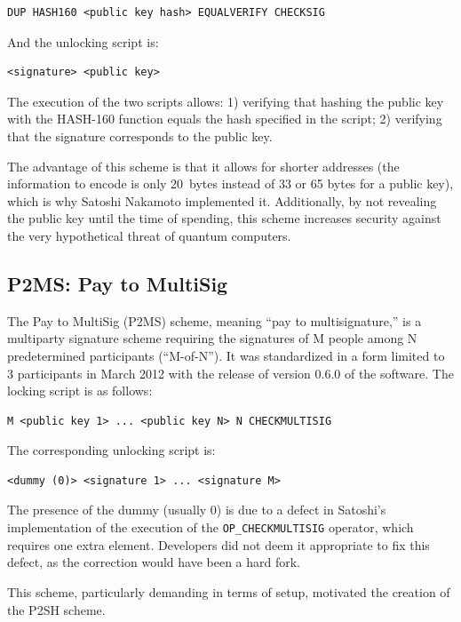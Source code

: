 \documentclass[
  a5paper,
  smalldemyvopaper,10pt,twoside,onecolumn,openright,extrafontsizes,hidelinks]{memoir}
\begin{document}
\begin{verbatim}
DUP HASH160 <public key hash> EQUALVERIFY CHECKSIG
\end{verbatim}

And the unlocking script is:

\begin{verbatim}
<signature> <public key>
\end{verbatim}

The execution of the two scripts allows: 1) verifying that hashing the
public key with the HASH-160 function equals the hash specified in the
script; 2) verifying that the signature corresponds to the public key.

The advantage of this scheme is that it allows for shorter addresses
(the information to encode is only 20~bytes instead of 33 or 65 bytes
for a public key), which is why Satoshi Nakamoto implemented it.
Additionally, by not revealing the public key until the time of
spending, this scheme increases security against the very hypothetical
threat of quantum computers.

\subsection{P2MS: Pay to MultiSig}\label{p2ms-pay-to-multisig}

The Pay to MultiSig (P2MS) scheme, meaning ``pay to multisignature,'' is
a multiparty signature scheme requiring the signatures of M people among
N predetermined participants (``M-of-N''). It was standardized in a form
limited to 3 participants in March 2012 with the release of version
0.6.0 of the software. The locking script is as follows:

\begin{verbatim}
M <public key 1> ... <public key N> N CHECKMULTISIG
\end{verbatim}

The corresponding unlocking script is:

\begin{verbatim}
<dummy (0)> <signature 1> ... <signature M>
\end{verbatim}

The presence of the dummy (usually 0) is due to a defect in Satoshi's
implementation of the execution of the \texttt{OP\_CHECKMULTISIG}
operator, which requires one extra element. Developers did not deem it
appropriate to fix this defect, as the correction would have been a hard
fork.

This scheme, particularly demanding in terms of setup, motivated the
creation of the P2SH scheme.
\end{document}
